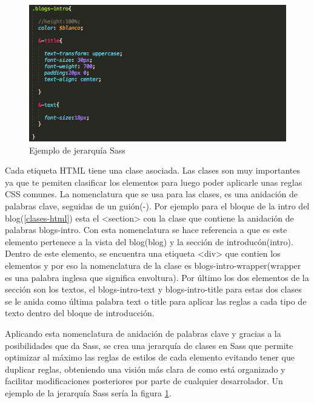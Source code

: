 \begin{figure}
\begin{center}
\includegraphics[width=1.0\textwidth]{imagenes/jerarquia-sass.png}
\caption{Ejemplo de jerarquía Sass}
\label{jerarquia-sass}
\end{center}
\end{figure}

Cada etiqueta HTML tiene una clase asociada. Las clases son muy importantes ya que te pemiten clasificar los elementos para luego poder aplicarle unas reglas CSS comunes. La nomenclatura que se usa para las clases, es una anidación de palabras clave, seguidas de un guión(-). Por ejemplo para el bloque de la intro del blog(\ref{clases-html}) esta el <section> con la clase que contiene la anidación de palabras blogs-intro. Con esta nomenclatura se hace referencia a que es este elemento pertenece a la vista del blog(blog) y la sección de introducón(intro). Dentro de este elemento, se encuentra una etiqueta <div> que contien los elementos y por eso la nomenclatura de la clase es blogs-intro-wrapper(wrapper es una palabra inglesa que significa envoltura). Por último los dos elementos de la sección son los textos, el blogs-intro-text y blogs-intro-title para estas dos clases se le anida como última palabra text o title para aplicar las reglas a cada tipo de texto dentro del bloque de introducción.

\vspace{5 mm}

Aplicando esta nomenclatura de anidación de palabras clave y gracias a la posibilidades que da Sass, se crea una jerarquía de clases en Sass que permite optimizar al máximo las reglas de estilos de cada elemento evitando tener que duplicar reglas, obteniendo una visión más clara de como está organizado y facilitar modificaciones posteriores por parte de cualquier desarrolador. Un ejemplo de la jerarquía Sass sería la figura \ref{jerarquia-sass}.


